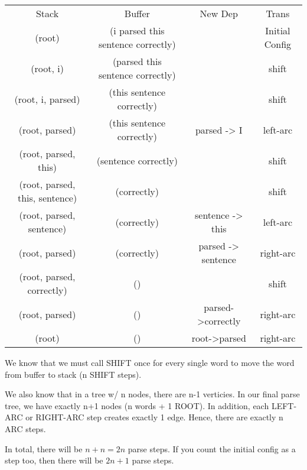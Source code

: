 \documentclass[11pt,largemargins]{homework}
\begin{document}
\begin{center}
\begin{tabular}{ |c|c|c|c| }
 \hline
   Stack & Buffer & New Dep & Trans \\
   (root) & (i parsed this sentence correctly) &  & Initial Config \\
   (root, i) & (parsed this sentence correctly) &  & shift \\
   (root, i, parsed) & (this sentence correctly) &  & shift \\
   (root, parsed) & (this sentence correctly) & parsed -> I & left-arc \\
   (root, parsed, this) & (sentence correctly) &  & shift \\
   (root, parsed, this, sentence) & (correctly) &  & shift \\
   (root, parsed, sentence) & (correctly) & sentence -> this & left-arc \\
   (root, parsed) & (correctly) & parsed -> sentence  & right-arc \\
   (root, parsed, correctly) & () &  & shift \\
   (root, parsed) & () & parsed->correctly  & right-arc \\
   (root) & () & root->parsed  & right-arc \\
 \hline
\end{tabular}
\end{center}

\question

We know that we must call SHIFT once for every single word to move the word from buffer to stack (n SHIFT steps).

We also know that in a tree w/ n nodes, there are n-1 verticies. In our final parse tree, we have exactly n+1 nodes (n words + 1 ROOT). In addition, each LEFT-ARC or RIGHT-ARC step creates exactly 1 edge. Hence, there are exactly n ARC steps. 

In total, there will be $n + n = 2n$ parse steps. If you count the initial config as a step too, then there will be $2n+1$ parse steps. 
\end{document}
